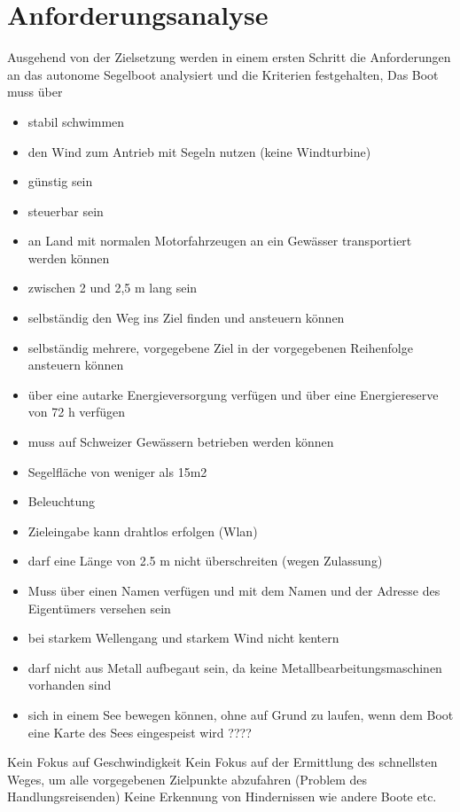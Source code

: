 \section{Anforderungsanalyse}
Ausgehend von der Zielsetzung werden in einem ersten Schritt die Anforderungen an das autonome Segelboot analysiert und die Kriterien festgehalten, Das Boot muss über
\begin{itemize}
    \item stabil schwimmen
    \item den Wind zum Antrieb mit Segeln nutzen (keine Windturbine)
    \item günstig sein
    \item steuerbar sein
    \item an Land mit normalen Motorfahrzeugen an ein Gewässer transportiert werden können
    \item zwischen 2 und 2,5 m lang sein
    \item selbständig den Weg ins Ziel finden und ansteuern können
    \item selbständig mehrere, vorgegebene Ziel in der vorgegebenen Reihenfolge ansteuern können
    \item über eine autarke Energieversorgung verfügen und über eine Energiereserve von 72 h verfügen 
    \item muss auf Schweizer Gewässern betrieben werden können 
    \item Segelfläche von weniger als 15m2
    \item Beleuchtung
    \item Zieleingabe kann drahtlos erfolgen (Wlan)
    \item darf eine Länge von 2.5 m nicht überschreiten (wegen Zulassung)
    \item Muss über einen Namen verfügen und mit dem Namen und der Adresse des Eigentümers versehen sein 
    \item bei starkem Wellengang und starkem Wind nicht kentern
    \item darf nicht aus Metall aufbegaut sein, da keine Metallbearbeitungsmaschinen vorhanden sind
    \item sich in einem See bewegen können, ohne auf Grund zu laufen, wenn dem Boot eine Karte des Sees eingespeist wird ????
\end{itemize}

Kein Fokus auf Geschwindigkeit
Kein Fokus auf der Ermittlung des schnellsten Weges, um alle vorgegebenen Zielpunkte abzufahren (Problem des Handlungsreisenden)
Keine Erkennung von Hindernissen wie andere Boote etc.
 

